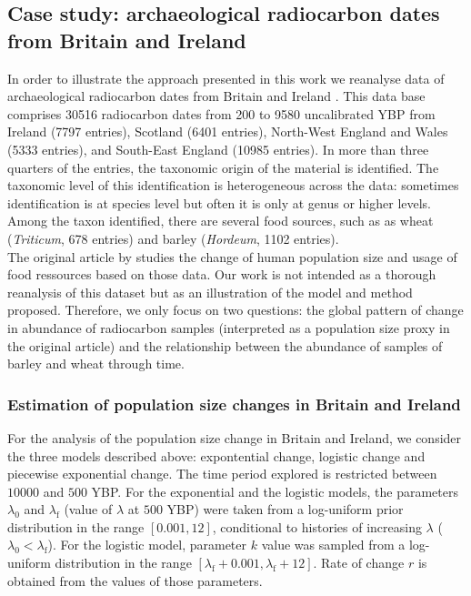 \documentclass[a4paper]{article}
\begin{document}
\subsection*{Case study: archaeological radiocarbon dates from Britain and Ireland}

In order to illustrate the approach presented in this work we reanalyse data of archaeological radiocarbon dates from Britain and Ireland \parencite{Bevan2017b}. This data base comprises 30516 radiocarbon dates from 200 to 9580 uncalibrated YBP from Ireland (7797 entries), Scotland (6401 entries), North-West England and Wales (5333 entries), and South-East England (10985 entries). In more than three quarters of the entries, the taxonomic origin of the material is identified. The taxonomic level of this identification is heterogeneous across the data: sometimes identification is at species level but often it is only at genus or higher levels. Among the taxon identified, there are several food sources, such as as wheat (\emph{Triticum}, 678 entries) and barley (\emph{Hordeum}, 1102 entries). 
\\

The original article by \textcite{Bevan2017a} studies the change of human population size and usage of food ressources based on those data. Our work is not intended as a thorough reanalysis of this dataset but as an illustration of the model and method proposed. Therefore, we only focus on two questions: the global pattern of change in abundance of radiocarbon samples (interpreted as a population size proxy in the original article) and the relationship between the abundance of samples of barley and wheat through time.
\\

\subsubsection*{Estimation of population size changes in Britain and Ireland}

For the analysis of the population size change in Britain and Ireland, we consider the three models described above: expontential change, logistic change and piecewise exponential change. The time period explored is restricted between $10000$ and $500$ YBP. For the exponential and the logistic models, the parameters $\lambda_0$ and $\lambda_\mathrm{f}$ (value of $\lambda$ at $500$ YBP) were taken from a log-uniform prior distribution in the range $\left[ 0.001,12\right]$, conditional to histories of increasing $\lambda$ ($\lambda_0 < \lambda_\mathrm{f}$). For the logistic model, parameter $k$ value was sampled from a log-uniform distribution in the range $\left[\lambda_\mathrm{f}+0.001,\lambda_\mathrm{f}+12\right]$. Rate of change $r$ is obtained from the values of those parameters.
\\
\end{document}
